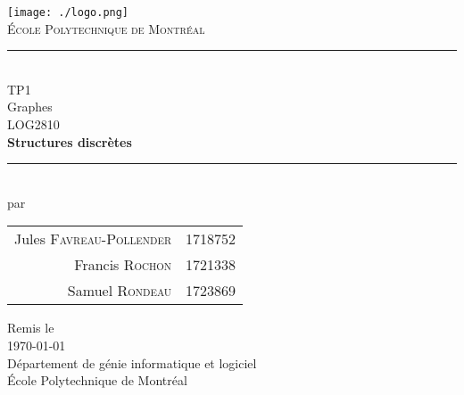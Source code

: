 \documentclass[10pt,letterpaper]{article}
\begin{document}
\begin{titlepage}
\begin{center}

\texttt{[image: ./logo.png]}~\\[1cm]

\textsc{\huge École Polytechnique de Montréal}\\[1.5cm]

\rule{0.5\linewidth}{0.5mm} \\[0.4cm]
{\LARGE TP1}\\[0.4cm]
{\Large Graphes}\\[1.0cm]

{\large LOG2810}\\[0.4cm]
{\large \textbf{Structures discrètes}}\\[0.4cm]

\rule{0.5\linewidth}{0.5mm} \\[1.0cm]

{\large par}\\[0.6cm]
\begin{Large}
  \begin{tabular}{r l}
    Jules \textsc{Favreau-Pollender} & 1718752\\[0.4cm]
    Francis \textsc{Rochon} & 1721338\\[0.4cm]
    Samuel \textsc{Rondeau} & 1723869\\[0.4cm]
  \end{tabular}
\end{Large}


\vfill

{\large Remis le}\\[0.3cm]
{\Large \today}\\[1.5cm]
{\large Département de génie informatique et logiciel}\\[0.3cm]
{\large École Polytechnique de Montréal}

\end{center}
\end{titlepage}
\end{document}
